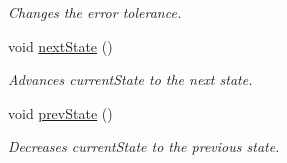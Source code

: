 \begin{DoxyCompactItemize}
\begin{DoxyCompactList}\small\item\em Changes the error tolerance. \end{DoxyCompactList}\item 
\mbox{\label{classSGGameHandler_a0dcae7330df350da70211c7db489234b}} 
void \hyperlink{classSGGameHandler_a0dcae7330df350da70211c7db489234b}{next\+State} ()
\begin{DoxyCompactList}\small\item\em Advances current\+State to the next state. \end{DoxyCompactList}\item 
\mbox{\label{classSGGameHandler_a24a4f716b7b80be52d7092575d92767e}} 
void \hyperlink{classSGGameHandler_a24a4f716b7b80be52d7092575d92767e}{prev\+State} ()
\begin{DoxyCompactList}\small\item\em Decreases current\+State to the previous state. \end{DoxyCompactList}\end{DoxyCompactItemize}
